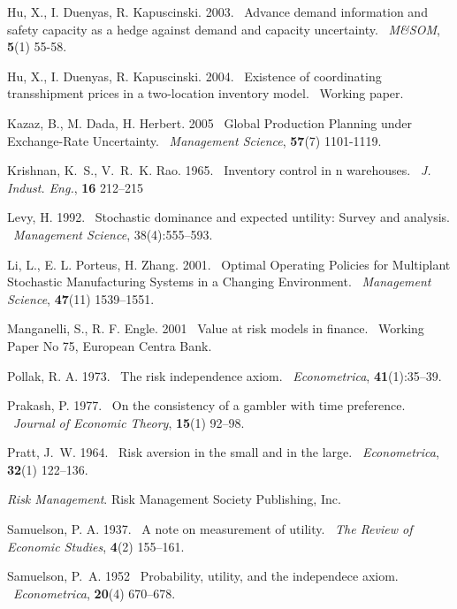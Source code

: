 \documentclass[mnsc,nonblindrev,copyedit]{informs2_wz} %
\def\newblock{\ }%
\begin{document}
\begin{thebibliography}{1}
Hu, X., I. Duenyas, R. Kapuscinski. 2003.
\newblock Advance demand information and safety capacity as a hedge against
  demand and capacity uncertainty.
\newblock {\em M\&SOM}, {\bf 5}(1) 55-58.

Hu, X., I. Duenyas, R. Kapuscinski. 2004.
\newblock Existence of coordinating transshipment prices in a two-location
  inventory model.
\newblock Working paper.

Kazaz, B., M. Dada, H. Herbert. 2005
\newblock Global Production Planning under Exchange-Rate Uncertainty.
\newblock {\em Management Science}, {\bf 57}(7) 1101-1119.



Krishnan, K.~S., V.~R.~K. Rao. 1965.
\newblock Inventory control in n warehouses.
\newblock {\em J. Indust. Eng.}, {\bf 16} 212--215

Levy, H. 1992.
\newblock Stochastic dominance and expected untility: Survey and analysis.
\newblock {\em Management Science}, 38(4):555--593.

Li, L., E. L. Porteus, H. Zhang. 2001.
\newblock Optimal Operating Policies for Multiplant Stochastic Manufacturing
  Systems in a Changing Environment.
\newblock {\em Management Science}, {\bf 47}(11) 1539--1551.

Manganelli, S., R. F. Engle. 2001
\newblock Value at risk models in finance.
\newblock Working Paper No 75, European Centra Bank.

Pollak, R. A. 1973.
\newblock The risk independence axiom.
\newblock {\em Econometrica}, {\bf 41}(1):35--39.

Prakash, P. 1977.
\newblock On the consistency of a gambler with time preference.
\newblock {\em Journal of Economic Theory}, {\bf 15}(1) 92--98.

Pratt, J.~W. 1964.
\newblock Risk aversion in the small and in the large.
\newblock {\em Econometrica}, {\bf 32}(1) 122--136.

{\em Risk Management}. Risk Management Society Publishing, Inc.

Samuelson, P. A. 1937.
\newblock A note on measurement of utility.
\newblock {\em The Review of Economic Studies}, {\bf 4}(2) 155--161.

Samuelson, P.~A. 1952
\newblock Probability, utility, and the independece axiom.
\newblock {\em Econometrica}, {\bf 20}(4) 670--678.


\end{thebibliography}
\end{document}
